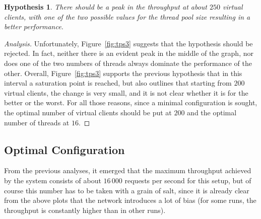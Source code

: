 \documentclass[11pt]{article}
\newtheorem{hyp}{Hypothesis}
\theoremstyle{definition}
\newenvironment{ana}[1][\proofname]{\begin{proof}[Analysis]}{\end{proof}}
\begin{document}
\begin{hyp}
    There should be a peak in the throughput at about $250$ virtual clients, with one of the two possible values for the thread pool size resulting in a better performance.
\end{hyp}
\begin{ana}
    Unfortunately, Figure~\ref{fig:tps3} suggests that the hypothesis should be rejected.
    In fact, neither there is an evident peak in the middle of the graph, nor does one of the two numbers of threads always dominate the performance of the other.
    Overall, Figure~\ref{fig:tps3} supports the previous hypothesis that in this interval a saturation point is reached, but also outlines that starting from $200$ virtual clients, the change is very small, and it is not clear whether it is for the better or the worst.
    For all those reasons, since a minimal configuration is sought, the optimal number of virtual clients should be put at $200$ and the optimal number of threads at $16$.
\end{ana}

\begin{comment}
\subsection{Empirical Justification of the Optimal Configuration}

From the plot resulting from the baseline experiment performed in the first milestone, an upper bound on the throughput for two clients interacting with one server and no middleware can be put at about $35\,000$ requests per second.
Moreover, in that milestone as empirical overhead for the middleware, a $77\%$ \emph{decrease} in throughput was estimated.
An upper bound for the throughput of five clients connected to the middleware can thus be estimated as
\[(35\,000-0.77\cdot35\,000)\cdot2.5=20\,125.\]
From Fiures~\ref{fig:tps1},~\ref{fig:tps2}, and \ref{fig:tps3}, this upper bound seems to be pretty accurate, also considering that the modification made to the middlewars (reported in Appendix~\ref{app:code}) resulted in a worst performance.
\end{comment}

\subsection{Optimal Configuration}

From the previous analyses, it emerged that the maximum throughput achieved by the system consists of about $16\,000$ requests per second for this setup, but of course this number has to be taken with a grain of salt, since it is already clear from the above plots that the network introduces a lot of bias (for some runs, the throughput is constantly higher than in other runs).
\end{document}

